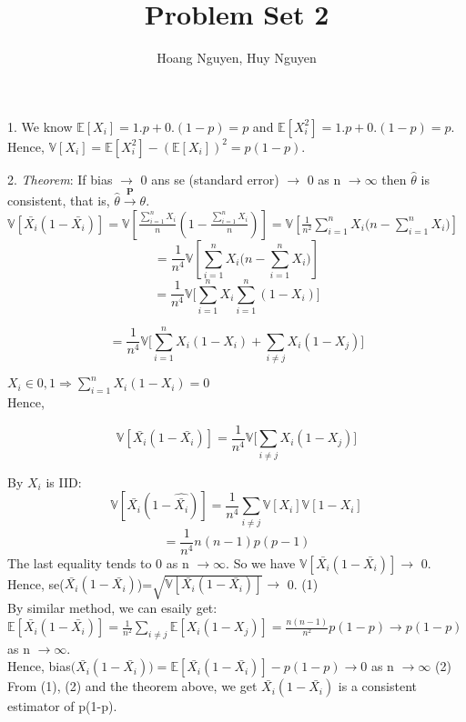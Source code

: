 \documentclass[10pt]{article}
\newenvironment{problem}[2][Problem]{\begin{trivlist}
\item[\hskip \labelsep {\bfseries #1}\hskip \labelsep {\bfseries #2.}]}{\end{trivlist}}
\begin{document}
\title{Problem Set 2}
\author{Hoang Nguyen, Huy Nguyen}
\maketitle
    
\begin{problem}{1}
\item 1.
We know $\mathbb{E}[X_i]=1.p+ 0.(1-p)=p$ and $\mathbb{E}[X_i^2]=1.p+ 0.(1-p)=p$. Hence, $\mathbb{V}[X_i]= \mathbb{E}[X_i^2]- (\mathbb{E}[X_i])^2 =p(1-p).$
\item 2. \textit{Theorem}: If bias $\rightarrow$ 0 ans se (standard error) $\rightarrow$ 0 as n $\rightarrow \infty$ then $\hat{\theta}$ is consistent, that is, $\hat{\theta} \xrightarrow{\textbf{P}} \theta$.\\




$\mathbb{V}[\bar{X_i}(1-\bar{X_i})]=\mathbb{V}[\frac{\sum_{i=1}^{n} X_i}{n}(1-\frac{\sum_{i=1}^{n} X_i}{n})]=\mathbb{V}[\frac{1}{n^2} \sum_{i=1}^{n} X_i \Big(n-\sum_{i=1}^{n} X_i\Big) ]$ 
\[=\frac{1}{n^4} \mathbb{V}[\sum_{i=1}^{n} X_i \Big(n-\sum_{i=1}^{n} X_i\Big)]\]
\[=\frac{1}{n^4} \mathbb{V}\Big[ \sum_{i=1}^{n} X_i \sum_{i=1}^{n} (1-X_i) \Big]\]

\[=\frac{1}{n^4} \mathbb{V}\Big[\sum_{i=1}^{n} X_i(1-X_i) +\sum_{i \neq j} X_i(1-X_j) \Big] \]

$X_i \in {0,1 } \Rightarrow \sum_{i=1}^{n} X_i(1-X_i)=0$ 
\\
Hence, 

\[\mathbb{V}[\bar{X_i}(1-\bar{X_i})]= \frac{1}{n^4} \mathbb{V} \Big[ \sum_{i \neq j} X_i(1-X_j) \Big] \]

By $X_i$ is IID:
 \[\mathbb{V}[\bar{X_i}(1-\hat{\bar{X_i}})]= \frac{1}{n^4} \sum_{i \neq j} \mathbb{V} [X_i]\mathbb{V}[1-X_i] \]
\[= \frac{1}{n^4} n(n-1)p(p-1) \]
The last equality tends to 0 as n $\rightarrow \infty$. So we have  $\mathbb{V}[\bar{X_i}(1-\bar{X_i})] \rightarrow$ 0. \\
Hence, se($\bar{X_i}(1-\bar{X_i})$)=$\sqrt{\mathbb{V}[\bar{X_i}(1-\bar{X_i})]} \rightarrow$ 0. (1)\\
By similar method, we can esaily get: $\mathbb{E}[\bar{X_i}(1-\bar{X_i})]= \frac{1}{n^2} \sum_{i \neq j} \mathbb{E}[X_i(1-X_j)] = \frac{n(n-1)}{n^2} p(1-p) \rightarrow p(1-p)$ as n $\rightarrow \infty$.\\
Hence, bias$\Big(\bar{X_i}(1-\bar{X_i})\Big)= \mathbb{E}[\bar{X_i}(1-\bar{X_i})] - p(1-p) \rightarrow 0$ as n $\rightarrow \infty$  (2)\\
From (1), (2) and the theorem above, we get $\bar{X_i}(1-\bar{X_i})$ is a consistent estimator of p(1-p).


\end{problem}
\end{document}
